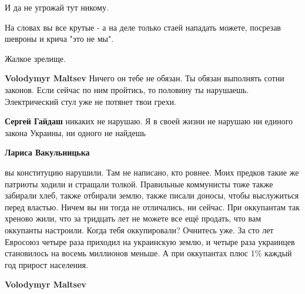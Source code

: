 \begin{itemize}
\begin{itemize}
И да не угрожай тут никому.

На словах вы все крутые - а на деле только стаей нападать можете, посрезав
шевроны и крича "это не мы".

Жалкое зрелище.

 
\textbf{Volodymyr Maltsev} Ничего он тебе не обязан. Ты обязан выполнять сотни
законов. Если сейчас по ним пройтись, то половину ты нарушаешь. Электрический
стул уже не потянет твои грехи.

 
\textbf{Сергей Гайдаш} никаких не нарушаю. Я в своей жизни не нарушаю ни единого закона Украины, ни одного не найдешь

 
\textbf{Лариса Вакульницька} 

вы конституцию нарушили. Там не написано, кто ровнее. Моих предков такие же
патриоты ходили и стращали толкой. Правильные коммунисты тоже также забирали
хлеб, также отбирали землю, также писали доносы, чтобы выслужиться перед
властью. Ничем вы ни тогда не отличались, ни сейчас. При оккупантам так хреново
жили, что за тридцать лет не можете все ещё продать, что вам оккупанты
настроили. Когда тебя оккупировали? Очнитесь уже. За сто лет Евросоюз четыре
раза приходил на украинскую землю, и четыре раза украинцев становилось на
восемь миллионов меньше. А при оккупантах плюс 1\% каждый год прирост населения.

 
\textbf{Volodymyr Maltsev} 


\end{itemize}
\end{itemize}
